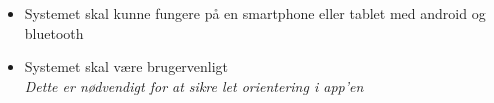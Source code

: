 \begin{itemize}
\item Systemet skal kunne fungere på en smartphone eller tablet med android og bluetooth
\item Systemet skal være brugervenligt
	\\
	\textit{Dette er nødvendigt for at sikre let orientering i app'en}
\end{itemize}



%
%
